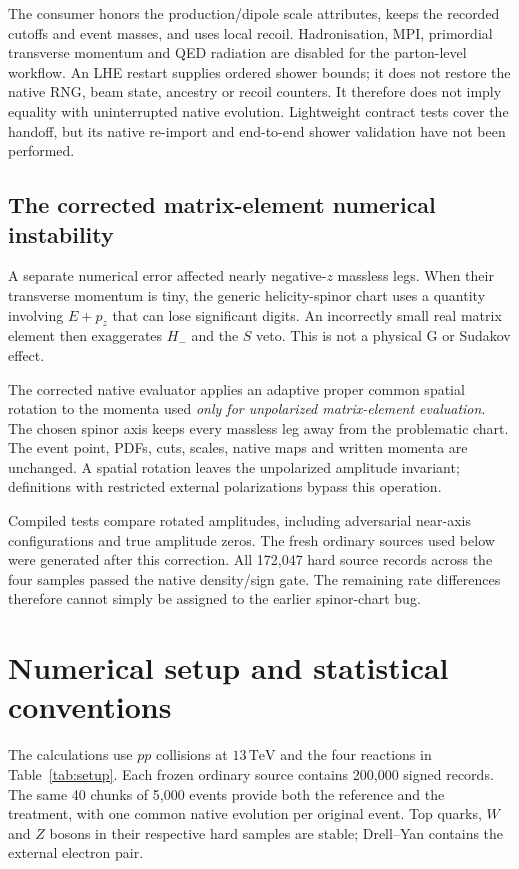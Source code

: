 \documentclass[11pt,a4paper]{article}
\begin{document}
The consumer honors the production/dipole scale attributes, keeps the
recorded cutoffs and event masses, and uses local recoil. Hadronisation,
MPI, primordial transverse momentum and QED radiation are disabled for
the parton-level workflow. An LHE restart supplies ordered shower bounds;
it does not restore the native RNG, beam state, ancestry or recoil
counters. It therefore does not imply equality with uninterrupted native
evolution. Lightweight contract tests cover the handoff, but its native
re-import and end-to-end shower validation have not been performed.

\subsection{The corrected matrix-element numerical instability}
\label{sec:numerics}
A separate numerical error affected nearly negative-$z$ massless legs.
When their transverse momentum is tiny, the generic helicity-spinor
chart uses a quantity involving $E+p_z$ that can lose significant
digits. An incorrectly small real matrix element then exaggerates
$H_-$ and the $S$ veto. This is not a physical G or Sudakov effect.

The corrected native evaluator applies an adaptive proper common
spatial rotation to the momenta used \emph{only for unpolarized
matrix-element evaluation}. The chosen spinor axis keeps every
massless leg away from the problematic chart. The event point, PDFs,
cuts, scales, native maps and written momenta are unchanged. A spatial
rotation leaves the unpolarized amplitude invariant; definitions with
restricted external polarizations bypass this operation.

Compiled tests compare rotated amplitudes, including adversarial
near-axis configurations and true amplitude zeros. The fresh ordinary
sources used below were generated after this correction. All 172,047
hard source records across the four samples passed the native
density/sign gate. The remaining rate differences therefore cannot
simply be assigned to the earlier spinor-chart bug.

\section{Numerical setup and statistical conventions}
\label{sec:setup}
The calculations use $pp$ collisions at $13\,\mathrm{TeV}$ and the four
reactions in Table~\ref{tab:setup}. Each frozen ordinary source contains
200,000 signed records. The same 40 chunks of 5,000 events provide both
the reference and the treatment, with one common native evolution per
original event. Top quarks, $W$ and $Z$ bosons in their respective hard
samples are stable; Drell--Yan contains the external electron pair.
\end{document}
